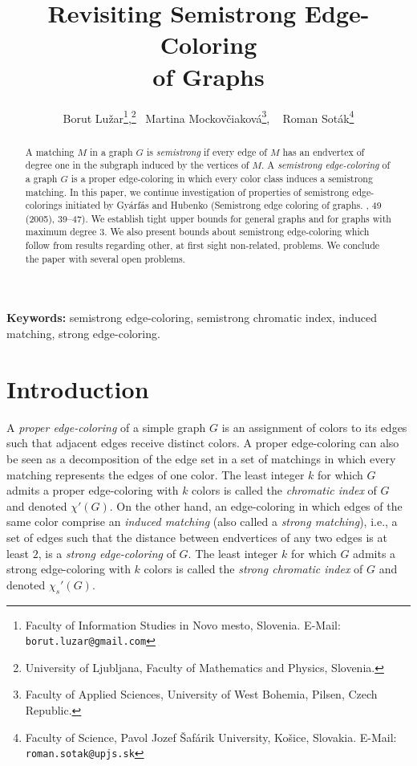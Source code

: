 \documentclass[12pt,a4paper]{article}
\newcommand{\chis}[1]{\ensuremath{\chi_{s}'(#1)}}
\begin{document}
\title{{\bf Revisiting Semistrong Edge-Coloring \\of Graphs}}

\author
{
	Borut Lu\v{z}ar\thanks{Faculty of Information Studies in Novo mesto, Slovenia. 
		E-Mail: \texttt{borut.luzar@gmail.com}},\thanks{University of Ljubljana, Faculty of Mathematics and Physics, Slovenia.} \
	Martina Mockov\v{c}iakov\'{a}\thanks{Faculty of Applied Sciences, University of West Bohemia, Pilsen, Czech Republic.}, \
	Roman Sot\'{a}k\thanks{Faculty of Science, Pavol Jozef \v Saf\'{a}rik University, Ko\v{s}ice, Slovakia.
		E-Mail: \texttt{roman.sotak@upjs.sk}}
}

\maketitle

{
\begin{abstract}
	A matching $M$ in a graph $G$ is {\em semistrong} 
	if every edge of $M$ has an endvertex of degree one in the subgraph induced by the vertices of $M$.
	A {\em semistrong edge-coloring} of a graph $G$ is a proper edge-coloring 
	in which every color class induces a semistrong matching.
	In this paper, we continue investigation of properties of semistrong edge-colorings initiated by Gy\'{a}rf\'{a}s and Hubenko 
	({Semistrong edge coloring of graphs}. , 49 (2005), 39--47). 
	We establish tight upper bounds for general graphs and for graphs with maximum degree $3$. 
	We also present bounds about semistrong edge-coloring which follow from results regarding other,
	at first sight non-related, problems.
	We conclude the paper with several open problems.
\end{abstract}
}

\medskip
{\noindent\small \textbf{Keywords:} semistrong edge-coloring, semistrong chromatic index, induced matching, strong edge-coloring.}

\section{Introduction}

A {\em proper edge-coloring} of a simple graph $G$ is an assignment of colors to its edges such that adjacent edges receive distinct colors.
A proper edge-coloring can also be seen as a decomposition of the edge set in a set of matchings 
in which every matching represents the edges of one color.
The least integer $k$ for which $G$ admits a proper edge-coloring with $k$ colors
is called the {\em chromatic index} of $G$ and denoted $\chi'(G)$.
On the other hand, an edge-coloring in which edges of the same color comprise an {\em induced matching} (also called a {\em strong matching}),
i.e., a set of edges such that the distance between endvertices of any two edges is at least $2$,
is a {\em strong edge-coloring} of $G$.
The least integer $k$ for which $G$ admits a strong edge-coloring with $k$ colors
is called the {\em strong chromatic index} of $G$ and denoted $\chis{G}$.
\end{document}
